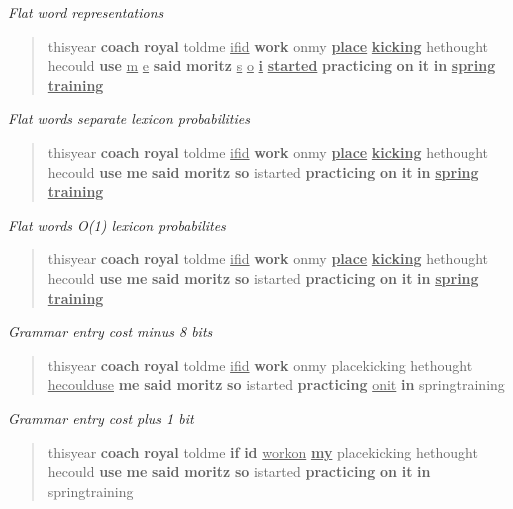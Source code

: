 \documentclass[11pt, oneside, fleqn]{article}
\begin{document}
\textsl{Flat word representations}
\begin{quote}thisyear \textbf{coach} \textbf{royal} toldme \underline{ifid} \textbf{work} onmy \textbf{\underline{place}} \textbf{\underline{kicking}} hethought hecould \textbf{use} \underline{m} \underline{e} \textbf{said} \textbf{moritz} \underline{s} \underline{o} \textbf{\underline{i}} \textbf{\underline{started}} \textbf{practicing} \textbf{on} \textbf{it} \textbf{in} \textbf{\underline{spring}} \textbf{\underline{training}}\end{quote}
	\vspace{1em}

\textsl{Flat words separate lexicon probabilities}
\begin{quote}thisyear \textbf{coach} \textbf{royal} toldme \underline{ifid} \textbf{work} onmy \textbf{\underline{place}} \textbf{\underline{kicking}} hethought hecould \textbf{use} \textbf{me} \textbf{said} \textbf{moritz} \textbf{so} istarted \textbf{practicing} \textbf{on} \textbf{it} \textbf{in} \textbf{\underline{spring}} \textbf{\underline{training}}\end{quote}
	\vspace{1em}

\textsl{Flat words O(1) lexicon probabilites}
\begin{quote}thisyear \textbf{coach} \textbf{royal} toldme \underline{ifid} \textbf{work} onmy \textbf{\underline{place}} \textbf{\underline{kicking}} hethought hecould \textbf{use} \textbf{me} \textbf{said} \textbf{moritz} \textbf{so} istarted \textbf{practicing} \textbf{on} \textbf{it} \textbf{in} \textbf{\underline{spring}} \textbf{\underline{training}}\end{quote}
	\vspace{1em}

\textsl{Grammar entry cost minus 8 bits}
\begin{quote}thisyear \textbf{coach} \textbf{royal} toldme \underline{ifid} \textbf{work} onmy placekicking hethought \underline{hecoulduse} \textbf{me} \textbf{said} \textbf{moritz} \textbf{so} istarted \textbf{practicing} \underline{onit} \textbf{in} springtraining\end{quote}
	\vspace{1em}

\textsl{Grammar entry cost plus 1 bit}
\begin{quote}thisyear \textbf{coach} \textbf{royal} toldme \textbf{if} \textbf{id} \underline{workon} \textbf{\underline{my}} placekicking hethought hecould \textbf{use} \textbf{me} \textbf{said} \textbf{moritz} \textbf{so} istarted \textbf{practicing} \textbf{on} \textbf{it} \textbf{in} springtraining\end{quote}
	\vspace{1em}
\end{document}
